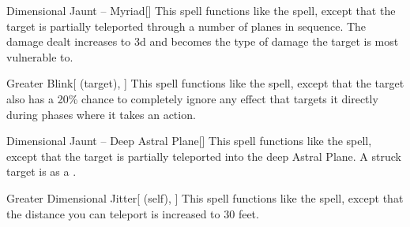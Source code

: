 \lowercase{\hypertarget{spell:Dimensional Jaunt -- Myriad}{}}\label{spell:Dimensional Jaunt -- Myriad}
\begin{freeability}[Rank 6]{\hypertarget{spell:Dimensional Jaunt -- Myriad}{Dimensional Jaunt -- Myriad}}[]
This spell functions like the  spell, except that the target is partially teleported through a number of planes in sequence.
The damage dealt increases to  \plus3d and becomes the type of damage the target is most vulnerable to.
\end{freeability}
\vspace{0.25em}



\lowercase{\hypertarget{spell:Greater Blink}{}}\label{spell:Greater Blink}
\begin{attuneability}[Rank 7]{\hypertarget{spell:Greater Blink}{Greater Blink}}[ (target), ]
This spell functions like the  spell, except that the target also has a 20\% chance to completely ignore any effect that targets it directly during phases where it takes an action.
\end{attuneability}
\vspace{0.25em}



\lowercase{\hypertarget{spell:Dimensional Jaunt -- Deep Astral Plane}{}}\label{spell:Dimensional Jaunt -- Deep Astral Plane}
\begin{freeability}[Rank 8]{\hypertarget{spell:Dimensional Jaunt -- Deep Astral Plane}{Dimensional Jaunt -- Deep Astral Plane}}[]
This spell functions like the  spell, except that the target is partially teleported into the deep Astral Plane.
A struck target is  as a .
\end{freeability}
\vspace{0.25em}



\lowercase{\hypertarget{spell:Greater Dimensional Jitter}{}}\label{spell:Greater Dimensional Jitter}
\begin{attuneability}[Rank 8]{\hypertarget{spell:Greater Dimensional Jitter}{Greater Dimensional Jitter}}[ (self), ]
This spell functions like the  spell, except that the distance you can teleport is increased to 30 feet.
\end{attuneability}
\vspace{0.25em}



